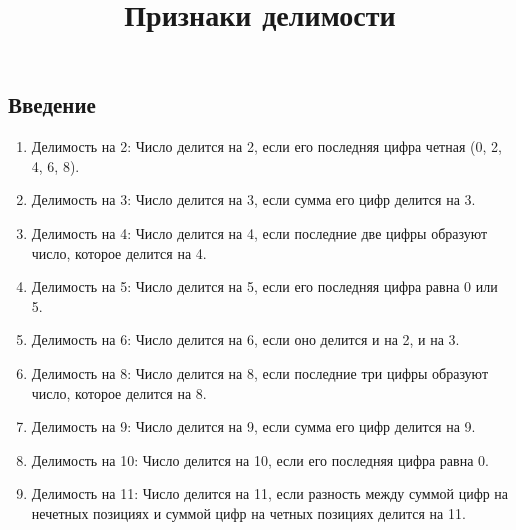 \documentclass[a4paper,12pt]{article}
\title{Признаки делимости}
\begin{document}
\maketitle
    \subsection*{Введение}
    \begin{enumerate}
        \item Делимость на 2: Число делится на 2, если его последняя цифра четная (0, 2, 4, 6, 8).
        \item Делимость на 3: Число делится на 3, если сумма его цифр делится на 3.
        
        \item Делимость на 4: Число делится на 4, если последние две цифры образуют число, которое делится на 4.
        
        \item Делимость на 5: Число делится на 5, если его последняя цифра равна 0 или 5.
        
        \item Делимость на 6: Число делится на 6, если оно делится и на 2, и на 3.
        
        \item Делимость на 8: Число делится на 8, если последние три цифры образуют число, которое делится на 8.
        
        \item Делимость на 9: Число делится на 9, если сумма его цифр делится на 9.
        
        \item Делимость на 10: Число делится на 10, если его последняя цифра равна 0.
        
        \item Делимость на 11: Число делится на 11, если разность между суммой цифр на нечетных позициях и суммой цифр на четных позициях делится на 11.
    \end{enumerate}
\end{document}
